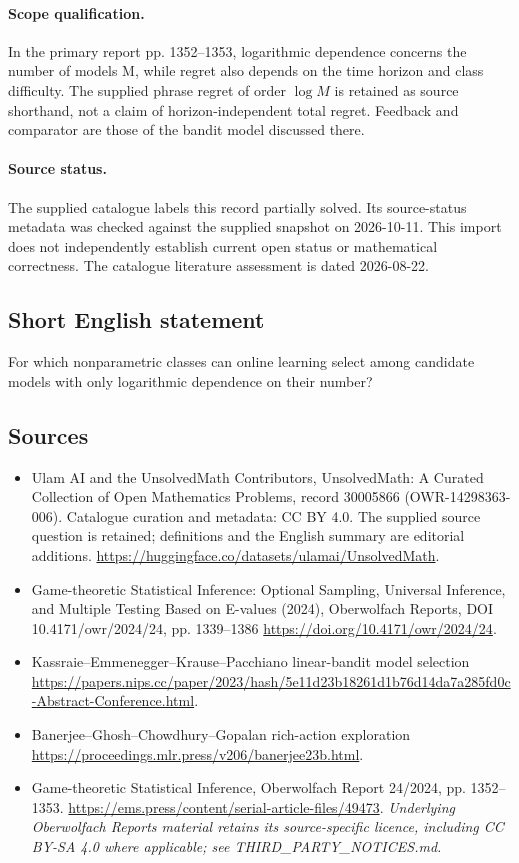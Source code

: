 \documentclass[11pt]{article}
\begin{document}
\paragraph{Scope qualification.}
In the primary report pp. 1352--1353, logarithmic dependence concerns the number of models M, while regret also depends on the time horizon and class difficulty. The supplied phrase regret of order $\log M$ is retained as source shorthand, not a claim of horizon-independent total regret. Feedback and comparator are those of the bandit model discussed there.
\paragraph{Source status.}
The supplied catalogue labels this record partially solved. Its source-status metadata was checked against the supplied snapshot on 2026-10-11. This import does not independently establish current open status or mathematical correctness. The catalogue literature assessment is dated 2026-08-22.
\subsection{Short English statement}
For which nonparametric classes can online learning select among candidate models with only logarithmic dependence on their number?
\subsection{Sources}
\begin{itemize}
\item[S1] Ulam AI and the UnsolvedMath Contributors, UnsolvedMath: A Curated Collection of Open Mathematics Problems, record 30005866 (OWR-14298363-006). Catalogue curation and metadata: CC BY 4.0. The supplied source question is retained; definitions and the English summary are editorial additions.
\url{https://huggingface.co/datasets/ulamai/UnsolvedMath}.
\item[S2] Game-theoretic Statistical Inference: Optional Sampling, Universal Inference, and Multiple Testing Based on E-values (2024), Oberwolfach Reports, DOI 10.4171/owr/2024/24, pp. 1339--1386
\url{https://doi.org/10.4171/owr/2024/24}.
\item[S3] Kassraie--Emmenegger--Krause--Pacchiano linear-bandit model selection
\url{https://papers.nips.cc/paper/2023/hash/5e11d23b18261d1b76d14da7a285fd0c-Abstract-Conference.html}.
\item[S4] Banerjee--Ghosh--Chowdhury--Gopalan rich-action exploration
\url{https://proceedings.mlr.press/v206/banerjee23b.html}.
\item[S5] Game-theoretic Statistical Inference, Oberwolfach Report 24/2024, pp. 1352--1353.
\url{https://ems.press/content/serial-article-files/49473}.
\textit{Underlying Oberwolfach Reports material retains its source-specific licence, including CC BY-SA 4.0 where applicable; see THIRD\_PARTY\_NOTICES.md.}
\end{itemize}
\end{document}
